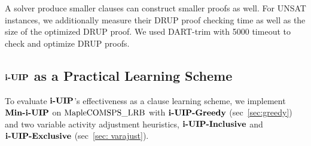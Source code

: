 A solver produce smaller clauses can construct smaller proofs as well. For UNSAT instances, we additionally measure their DRUP\cite{} proof checking time as well as the size of the optimized DRUP proof. We used DART-trim \cite{} with 5000 timeout to check and optimize DRUP proofs. 



\subsection{$\textbf{i-UIP}$ as a Practical Learning Scheme}
To evaluate $\textbf{i-UIP}$'s effectiveness as a clause learning scheme, we implement $\textbf{Min-i-UIP}$ on $\text{MapleCOMSPS\_LRB}$ with $\textbf{i-UIP-Greedy}$ (sec~\ref{sec:greedy}) and two variable activity adjustment heuristics,  $\textbf{i-UIP-Inclusive}$ and $\textbf{i-UIP-Exclusive}$ (sec~\ref{sec: varajust}).  

